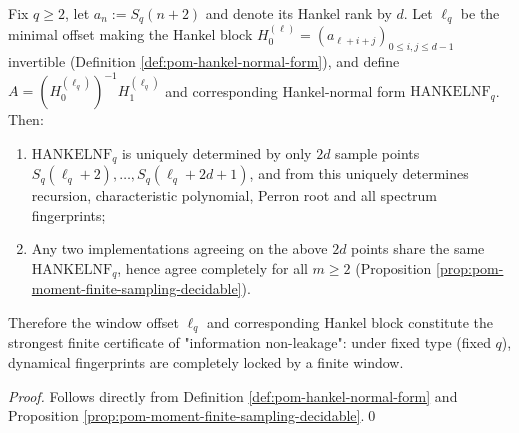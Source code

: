 \begin{theorem}\label{thm:dephys-hankel-finite-audit}
Fix \(q\ge 2\), let \(a_n:=S_q(n+2)\) and denote its Hankel rank by \(d\).
Let \(\ell_q\) be the minimal offset making the Hankel block \(H_0^{(\ell)}=(a_{\ell+i+j})_{0\le i,j\le d-1}\) invertible (Definition \ref{def:pom-hankel-normal-form}), and define
\(
A=(H_0^{(\ell_q)})^{-1}H_1^{(\ell_q)}
\)
and corresponding Hankel-normal form \(\mathrm{HANKELNF}_q\).
Then:
\begin{enumerate}
  \item \(\mathrm{HANKELNF}_q\) is uniquely determined by only \(2d\) sample points \(S_q(\ell_q+2),\dots,S_q(\ell_q+2d+1)\), and from this uniquely determines recursion, characteristic polynomial, Perron root and all spectrum fingerprints;
  \item Any two implementations agreeing on the above \(2d\) points share the same \(\mathrm{HANKELNF}_q\), hence agree completely for all \(m\ge 2\) (Proposition \ref{prop:pom-moment-finite-sampling-decidable}).
\end{enumerate}
Therefore the window offset \(\ell_q\) and corresponding Hankel block constitute the strongest finite certificate of "information non-leakage": under fixed type (fixed \(q\)), dynamical fingerprints are completely locked by a finite window.
\end{theorem}

\begin{proof}
Follows directly from Definition \ref{def:pom-hankel-normal-form} and Proposition \ref{prop:pom-moment-finite-sampling-decidable}.\qed
\end{proof}

